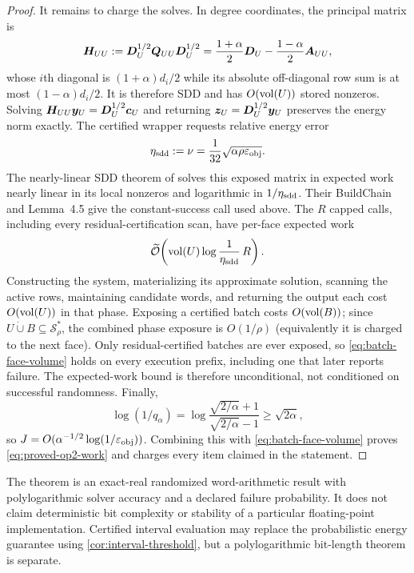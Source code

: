 \begin{proof}
It remains to charge the solves.  In degree coordinates, the principal matrix
is
\begin{equation}
 \bm{H}_{UU}:=\bm{D}_U^{1/2}\bm{Q}_{UU}\bm{D}_U^{1/2}
 =\frac{1+\alpha}{2}\bm{D}_U-\frac{1-\alpha}{2}\bm{A}_{UU},
 \label{eq:degree-sdd-face}
\end{equation}
whose $i$th diagonal is $(1+\alpha)d_i/2$ while its absolute off-diagonal
row sum is at most $(1-\alpha)d_i/2$.  It is therefore SDD and has
$O(\operatorname{vol}(U))$ stored nonzeros.  Solving
$\bm{H}_{UU}\bm{y}_U=\bm{D}_U^{1/2}\bm{c}_U$ and returning
$\bm{z}_U=\bm{D}_U^{1/2}\bm{y}_U$ preserves the energy norm exactly.  The certified
wrapper requests relative energy error
\begin{equation}
 \eta_{\rm sdd}:=\nu
 =\frac1{32}\sqrt{\alpha\rho\varepsilon_{\mathrm{obj}}}.
 \label{eq:sdd-relative-target}
\end{equation}
The nearly-linear SDD theorem of \citet[Theorem~4.6]{koutis2011nearly}
solves this exposed matrix in expected work nearly linear in its local
nonzeros and logarithmic in $1/\eta_{\rm sdd}$.  Their BuildChain and
Lemma~4.5 give the constant-success call used above.  The $R$ capped calls,
including every residual-certification scan, have per-face expected work
\[
 \widetilde{\mathcal{O}}\!\left(
   \operatorname{vol}(U)\log\frac1{\eta_{\rm sdd}}\,R
 \right).
\]
Constructing the system, materializing its approximate solution, scanning the
active rows, maintaining candidate words, and returning the output each cost
$O(\operatorname{vol}(U))$ in that phase.  Exposing a certified batch costs
$O(\operatorname{vol}(B))$; since $U\mathbin{\dot\cup}B\subseteq\mathcal S_\rho^*$, the
combined phase exposure is $O(1/\rho)$ (equivalently it is charged to the
next face).  Only residual-certified batches are ever exposed, so
\cref{eq:batch-face-volume} holds on every execution prefix, including one
that later reports failure.  The expected-work bound is therefore
unconditional, not conditioned on successful randomness.  Finally,
\begin{equation}
 \log(1/q_\alpha)
 =\log\frac{\sqrt{2/\alpha}+1}{\sqrt{2/\alpha}-1}
 \geq\sqrt{2\alpha},
 \label{eq:q-depth-bound}
\end{equation}
so $J=O(\alpha^{-1/2}\log(1/\varepsilon_{\mathrm{obj}}))$.  Combining this with
\cref{eq:batch-face-volume} proves \cref{eq:proved-op2-work} and charges every
item claimed in the statement.
\end{proof}

\begin{remark}
\label{rem:numerical-scope}
The theorem is an exact-real randomized word-arithmetic result with
polylogarithmic solver accuracy and a declared failure probability.  It does
not claim deterministic bit complexity or stability of a particular
floating-point implementation.  Certified interval evaluation may replace
the probabilistic energy guarantee using \cref{cor:interval-threshold}, but a
polylogarithmic bit-length theorem is separate.
\end{remark}

